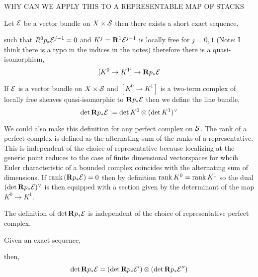 \documentclass[12pt]{article}
\begin{document}
{\color{red} WHY CAN WE APPLY THIS TO A REPRESENTABLE MAP OF STACKS}

Let $\E$ be a vector bundle on $X \times \S$ then there exists a short exact sequence,
\begin{center}
\end{center}
such that $R^0 p_* \E^{j-1} = 0$ and $K^j = \R^1 \E^{j-1}$ is locally free for $j = 0, 1$ {\color{red} (Note: I think there is a typo in the indices in the notes)} therefore there is a quasi-isomorphism,
\[ [ K^0 \to K^1] \to \R p_* \E \]

\begin{defn}
If $\E$ is a vector bundle on $X \times \S$ and $[K^0 \to K^1]$ is a two-term complex of locally free sheaves quasi-isomorphic to $\R p_* \E$ then we define the line bundle,
\[ \det{\R p_* \E} := \det{K^0} \ot (\det{K^1})^\vee \] 
\end{defn}

We could also make this definition for any perfect complex on $\S$. The rank of a perfect complex is defined as the alternating sum of the ranks of a representative. This is independent of the choice of representative because localizing at the generic point reduces to the case of finite dimensional vectorspaces for whcih Euler characteristic of a bounded complex coincides with the alternating sum of dimensions. If $\rank{(\R p_* \E)} = 0$ then by definition $\rank{K^0} = \rank{K^1}$ so the dual $(\det{\R p_* \E})^\vee$ is then equipped with a section given by the determinant of the map $K^0 \to K^1$. 

\begin{lemma}
The definition of $\det{\R p_* \E}$ is independent of the choice of representative perfect complex.
\end{lemma}

\begin{lemma}
Given an exact sequence,
\begin{center}
\end{center}
then,
\[ \det{\R p_* \E} = (\det{\R p_* \E'}) \ot (\det{\R p_* \E''}) \]
\end{lemma}
\end{document}
